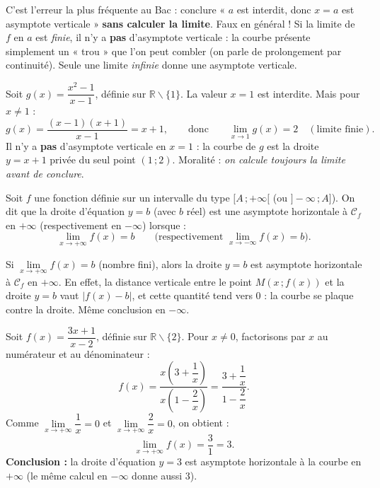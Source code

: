 \documentclass[11pt]{article}
\newcommand{\cle}[1]{{\popxbold\color{popdark}#1}}
\newcounter{popsec}
\newcounter{popsub}
\newcommand{\courssub}[1]{%
  \stepcounter{popsub}%
  \par\vspace{9pt}\noindent{\popxbold\fontsize{11.5}{13}\selectfont\color{popink}{\color{poporange}\thepopsec.\thepopsub}\hspace{6pt}#1}\par\nopagebreak\vspace{4pt}
}
\def\setminus{\mathbin{\backslash}}\let\smallsetminus\setminus
\begin{document}
\begin{attention}
C'est l'erreur la plus fréquente au Bac : conclure « $a$ est interdit, donc $x = a$ est asymptote verticale » \textbf{sans calculer la limite}. Faux en général ! Si la limite de $f$ en $a$ est \emph{finie}, il n'y a \textbf{pas} d'asymptote verticale : la courbe présente simplement un « trou » que l'on peut combler (on parle de \cle{prolongement par continuité}). Seule une limite \emph{infinie} donne une asymptote verticale.
\end{attention}

\begin{exemplebox}
Soit $g(x) = \dfrac{x^2 - 1}{x - 1}$, définie sur $\mathbb{R}\setminus\{1\}$. La valeur $x = 1$ est interdite. Mais pour $x \neq 1$ :
\[
g(x) = \frac{(x-1)(x+1)}{x-1} = x + 1 ,
\qquad\text{donc}\qquad
\lim_{x \to 1} g(x) = 2 \quad (\text{limite finie}).
\]
Il n'y a \textbf{pas} d'asymptote verticale en $x = 1$ : la courbe de $g$ est la droite $y = x + 1$ privée du seul point $(1\,;2)$. Moralité : \emph{on calcule toujours la limite avant de conclure}.
\end{exemplebox}

\courssub{Asymptote horizontale}

\begin{definition}
Soit $f$ une fonction définie sur un intervalle du type $[A\,;+\infty[$ (ou $]-\infty\,;A]$). On dit que la droite d'équation $y = b$ (avec $b$ réel) est une \cle{asymptote horizontale} à $\mathcal{C}_f$ en $+\infty$ (respectivement en $-\infty$) lorsque :
\[
\lim_{x \to +\infty} f(x) = b
\qquad\text{(respectivement } \lim_{x \to -\infty} f(x) = b\text{)}.
\]
\end{definition}

\begin{propriete}
Si $\lim\limits_{x \to +\infty} f(x) = b$ (nombre fini), alors la droite $y = b$ est asymptote horizontale à $\mathcal{C}_f$ en $+\infty$. En effet, la distance verticale entre le point $M(x\,;f(x))$ et la droite $y = b$ vaut $|f(x) - b|$, et cette quantité tend vers $0$ : la courbe se plaque contre la droite. Même conclusion en $-\infty$.
\end{propriete}

\begin{exemplebox}
Soit $f(x) = \dfrac{3x+1}{x-2}$, définie sur $\mathbb{R}\setminus\{2\}$. Pour $x \neq 0$, factorisons par $x$ au numérateur et au dénominateur :
\[
f(x) = \frac{x\left(3 + \dfrac{1}{x}\right)}{x\left(1 - \dfrac{2}{x}\right)} = \frac{3 + \dfrac{1}{x}}{1 - \dfrac{2}{x}} .
\]
Comme $\lim\limits_{x \to +\infty} \dfrac{1}{x} = 0$ et $\lim\limits_{x \to +\infty} \dfrac{2}{x} = 0$, on obtient :
\[
\lim_{x \to +\infty} f(x) = \frac{3}{1} = 3 .
\]
\textbf{Conclusion :} la droite d'équation $y = 3$ est asymptote horizontale à la courbe en $+\infty$ (le même calcul en $-\infty$ donne aussi $3$).
\end{exemplebox}
\end{document}

